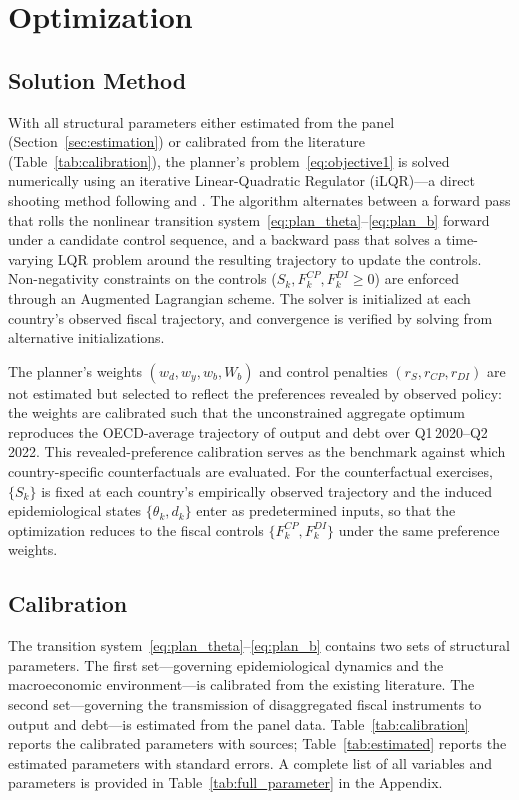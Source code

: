 \documentclass[12pt, a4paper]{article}
\begin{document}
\section{Optimization}
\subsection{Solution Method}

With all structural parameters either estimated from the panel (Section~\ref{sec:estimation}) or calibrated from the literature (Table~\ref{tab:calibration}), the planner's problem~\eqref{eq:objective1} is solved numerically using an iterative Linear-Quadratic Regulator (iLQR)---a direct shooting method following \citet{li2004iterative} and \citet{bertsekas2017dynamic}. The algorithm alternates between a forward pass that rolls the nonlinear transition system~\eqref{eq:plan_theta}--\eqref{eq:plan_b} forward under a candidate control sequence, and a backward pass that solves a time-varying LQR problem around the resulting trajectory to update the controls. Non-negativity constraints on the controls ($S_k, F^{CP}_k, F^{DI}_k \geq 0$) are enforced through an Augmented Lagrangian scheme. The solver is initialized at each country's observed fiscal trajectory, and convergence is verified by solving from alternative initializations.

The planner's weights $(w_d, w_y, w_b, W_b)$ and control penalties $(r_S, r_{CP}, r_{DI})$ are not estimated but selected to reflect the preferences revealed by observed policy: the weights are calibrated such that the unconstrained aggregate optimum reproduces the OECD-average trajectory of output and debt over Q1\,2020--Q2\,2022. This revealed-preference calibration serves as the benchmark against which country-specific counterfactuals are evaluated. For the counterfactual exercises, $\{S_k\}$ is fixed at each country's empirically observed trajectory and the induced epidemiological states $\{\theta_k, d_k\}$ enter as predetermined inputs, so that the optimization reduces to the fiscal controls $\{F^{CP}_k, F^{DI}_k\}$ under the same preference weights.

\subsection{Calibration}

\noindent The transition system~\eqref{eq:plan_theta}--\eqref{eq:plan_b} contains two sets of structural parameters. The first set---governing epidemiological dynamics and the macroeconomic environment---is calibrated from the existing literature. The second set---governing the transmission of disaggregated fiscal instruments to output and debt---is estimated from the panel data. Table~\ref{tab:calibration} reports the calibrated parameters with sources; Table~\ref{tab:estimated} reports the estimated parameters with standard errors. A complete list of all variables and parameters is provided in Table~\ref{tab:full_parameter} in the Appendix.
\end{document}
